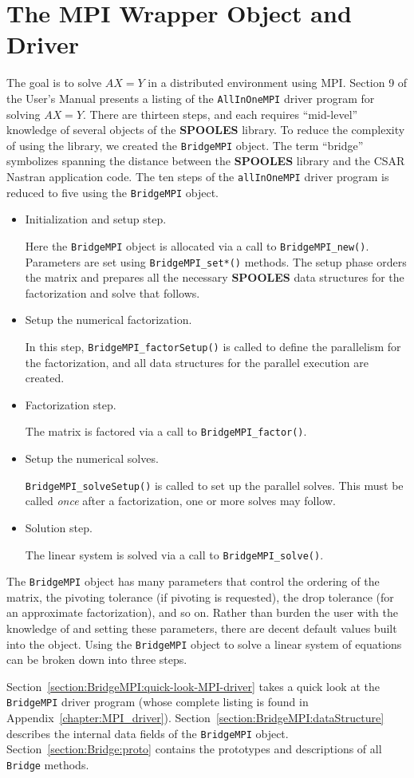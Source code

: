 \chapter{The MPI Wrapper Object and Driver}
\label{section:MPI}
\par
The goal is to solve $AX = Y$ in a distributed environment using MPI.
Section 9 of the User's Manual presents a listing of the 
{\tt AllInOneMPI} driver program for solving $AX =Y$.
There are thirteen steps, and each requires ``mid-level'' knowledge 
of several objects of the {\bf SPOOLES} library.
To reduce the complexity of using the library, 
we created the {\tt BridgeMPI} object.
The term ``bridge'' symbolizes spanning the distance between the
{\bf SPOOLES} library and the CSAR Nastran application code.
The ten steps of the {\tt allInOneMPI} driver program is reduced to
five using the {\tt BridgeMPI} object.
\begin{itemize}
\item Initialization and setup step.
\par
Here the {\tt BridgeMPI} object is allocated via a call to 
{\tt BridgeMPI\_new()}.
Parameters are set using {\tt BridgeMPI\_set*()} methods.
The setup phase orders the matrix and prepares all the necessary 
{\bf SPOOLES} data structures for the factorization and solve 
that follows.
\item Setup the numerical factorization.
\par
In this step, 
{\tt BridgeMPI\_factorSetup()} is called
to define the parallelism for the factorization,
and all data structures for the parallel execution are created.
\item Factorization step.
\par
The matrix is factored via a call to {\tt BridgeMPI\_factor()}.
\item Setup the numerical solves.
\par
{\tt BridgeMPI\_solveSetup()} is called to set up the parallel solves.
This must be called {\it once} after a factorization,
one or more solves may follow.
\item Solution step.
\par
The linear system is solved via a call to {\tt BridgeMPI\_solve()}.
\end{itemize}
\par
The {\tt BridgeMPI} object 
has many parameters that control the ordering of the matrix,
the pivoting tolerance (if pivoting is requested),
the drop tolerance (for an approximate factorization),
and so on.
Rather than burden the user with the knowledge of and setting these
parameters, there are decent default values built into the object.
Using the {\tt BridgeMPI} object to solve a linear system of equations 
can be broken down into three steps.
\par
Section~\ref{section:BridgeMPI:quick-look-MPI-driver} takes a quick
look at the {\tt BridgeMPI} driver program (whose complete listing is
found in Appendix~\ref{chapter:MPI_driver}).
Section~\ref{section:BridgeMPI:dataStructure} describes the internal 
data fields of the {\tt BridgeMPI} object.
Section~\ref{section:Bridge:proto} contains the prototypes and
descriptions of all {\tt Bridge} methods.
\par
